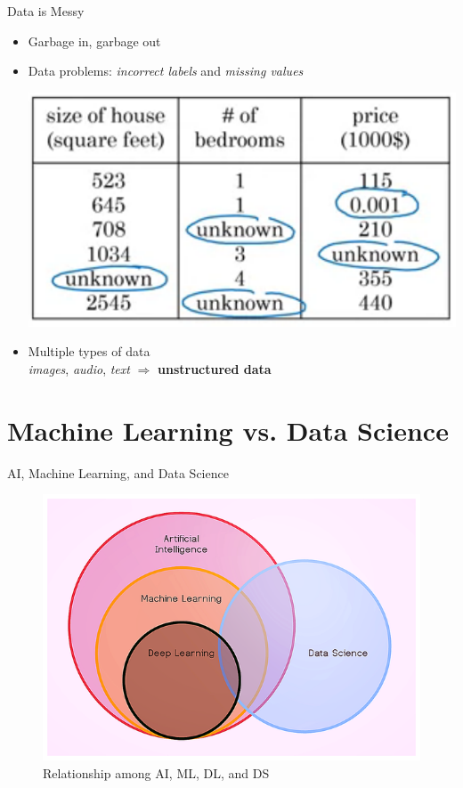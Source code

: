 \documentclass[pdf]{beamer}
\theoremstyle{mystyle}
\begin{document}
\begin{frame}{Data is Messy}
	\begin{itemize}
		\item<2-> Garbage in, garbage out
		\item<3-> Data problems: \textit{incorrect labels} and \textit{missing values} 
		\begin{center}
			\includegraphics[scale=.3]{data-problems} 
		\end{center}
		\item<4-> Multiple types of data \\
		\textit{images}, \textit{audio}, \textit{text} $\Rightarrow$ \textbf{unstructured data}					
	\end{itemize}
\end{frame}

\section{Machine Learning vs. Data Science}
\begin{frame}{AI, Machine Learning, and Data Science}
	\begin{figure}[!ht]
		\centering
		\includegraphics[scale=.45]{diagram-venn-deep-learning}
		\caption{Relationship among AI, ML, DL, and DS~\citep{kharkovyna2019ABeginnersGuide}}
	\end{figure}
\end{frame}
\end{document}
